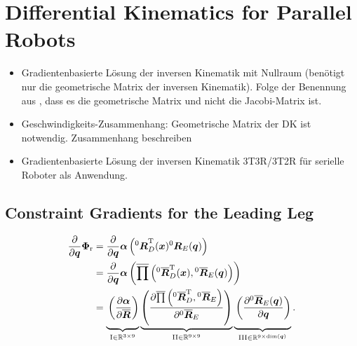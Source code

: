 \documentclass[robotics,article,submit,moreauthors,pdftex]{Definitions/mdpi}
\newcommand{\bm}[1]{\boldsymbol{#1}}
\newcommand{\rotmat}[2]{{{ }^{#1}\boldsymbol{R}}_{#2}}
\newcommand{\rotmato}[2]{{{ }^{#1}\boldsymbol{\overline{R}}}_{#2}}
\newcommand{\transp}[0]{{\mathrm{T}}}
\begin{document}
\section{Differential Kinematics for Parallel Robots}
\label{sec:ZB_Anwendung}

\begin{itemize}
    \item Gradientenbasierte Lösung der inversen Kinematik mit Nullraum (benötigt nur die geometrische Matrix der inversen Kinematik). Folge der Benennung aus \cite{Gogu2008}, dass es die geometrische Matrix und nicht die Jacobi-Matrix ist.
    \item Geschwindigkeits-Zusammenhang: Geometrische Matrix der DK ist notwendig. Zusammenhang beschreiben
    \item Gradientenbasierte Lösung der inversen Kinematik 3T3R/3T2R für serielle Roboter als Anwendung.
\end{itemize}

\subsection{Constraint Gradients for the Leading Leg}

\begin{align}
\frac{\partial}{\partial \bm{q}}\bm{\Phi}_{\mathrm{r}}
&=
\frac{\partial}{\partial \bm{q}} \bm{\alpha}\left(\rotmat{0}{D}^\transp(\bm{x}) \rotmat{0}{E}(\bm{q})\right) \label{equ:grad_Phi_q}\\
&=
\frac{\partial}{\partial \bm{q}} \bm{\alpha}\left(\overline{\prod}\left( \rotmato{0}{D}^\transp(\bm{x}), \rotmato{0}{E}(\bm{q})\right)\right) \nonumber \\
&=
\underbrace{\vphantom{\left(\frac{\partial \overline{\prod}\left(\rotmato{0}{D}^\transp, \rotmato{0}{E}\right)}{\partial \rotmato{0}{E}}\right)}\left(\frac{\partial \bm{\alpha}}{\partial \overline{\bm{R}}}\right)}_{\mathrm{I} \in {\mathbb{R}}^{3 \times 9}}
\underbrace{\left(\frac{\partial \overline{\prod}\left(\rotmato{0}{D}^\transp, \rotmato{0}{E}\right)}{\partial \rotmato{0}{E}}\right)}_{\mathrm{II} \in {\mathbb{R}}^{9 \times 9}}
\underbrace{\vphantom{\left(\frac{\partial \overline{\prod}\left(\rotmato{0}{D}^\transp, \rotmato{0}{E}\right)}{\partial \rotmato{0}{E}}\right)}\left(\frac{\partial \rotmato{0}{E}(\bm{q})}{\partial \bm{q}} \right)}_{\mathrm{III} \in {\mathbb{R}}^{9 \times \mathrm{dim}(\bm{q})}}.  \nonumber
\end{align}
\end{document}
